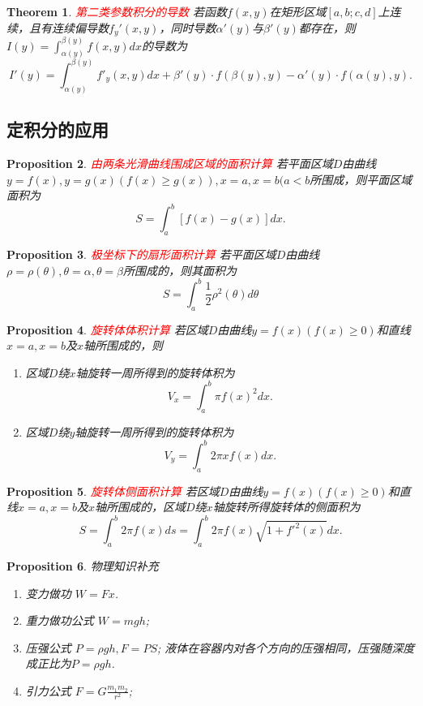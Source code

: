 \documentclass{article}
\newtheorem{theorem}{Theorem}[section]
\newtheorem{proposition}[theorem]{Proposition}
\newcommand{\redt}[1]{\textcolor{red}{#1}}
\begin{document}
\begin{theorem}
\rm \redt{第二类参数积分的导数} 若函数$f(x,y)$在矩形区域$[a,b;c,d]$上连续，且有连续偏导数$f_y'(x,y)$，同时导数$\alpha'(y)$与$\beta'(y)$都存在，则$I(y) = \int_{\alpha(y)}^{\beta(y)} f(x,y)dx$的导数为
$$
I'(y) = \int_{\alpha(y)}^{\beta(y)} f'_y(x,y)dx + \beta'(y)\cdot f(\beta(y),y)-\alpha'(y)\cdot f(\alpha(y),y). 
$$
\end{theorem}

\subsection{定积分的应用}

\begin{proposition}
\rm \redt{由两条光滑曲线围成区域的面积计算} 若平面区域$D$由曲线$y=f(x),y=g(x)(f(x)\geq g(x)),x=a,x=b(a < b$所围成，则平面区域面积为
$$
S = \int_a^b [f(x)-g(x)]dx.
$$
\end{proposition}

\begin{proposition}
\rm \redt{极坐标下的扇形面积计算} 若平面区域$D$由曲线$\rho=\rho(\theta), \theta=\alpha,\theta = \beta$所围成的，则其面积为
$$
S = \int_a^b \frac{1}{2}\rho^2(\theta)d\theta 
$$
\end{proposition}

\begin{proposition}
\rm \redt{旋转体体积计算} 若区域$D$由曲线$y=f(x)(f(x) \geq 0)$和直线$x=a,x=b$及$x$轴所围成的，则
\begin{enumerate}
	\item 区域$D$绕$x$轴旋转一周所得到的旋转体积为
	$$
	V_x = \int_{a}^b \pi f(x)^2dx.
	$$
	\item 区域$D$绕$y$轴旋转一周所得到的旋转体积为
	$$
	V_y = \int_{a}^b 2\pi xf(x)dx. 
	$$
\end{enumerate}
\end{proposition}

\begin{proposition}
\rm \redt{旋转体侧面积计算} 若区域$D$由曲线$y=f(x)(f(x) \geq 0)$和直线$x=a,x=b$及$x$轴所围成的，区域$D$绕$x$轴旋转所得旋转体的侧面积为
$$
S = \int_a^b 2\pi f(x)ds = \int_a^b 2\pi f(x) \sqrt{1+{f'}^2(x)}dx.
$$
\end{proposition}


\begin{proposition}
\rm 物理知识补充
\begin{enumerate}
	\item 变力做功 $W=Fx$.
	\item 重力做功公式 $W=mgh$;
	\item 压强公式 $P = \rho gh, F = PS$; 液体在容器内对各个方向的压强相同，压强随深度成正比为$P = \rho gh$. 
	\item 引力公式 $F = G \frac{m_1m_2}{r^2}$;	
\end{enumerate}
\end{proposition}
\end{document}
